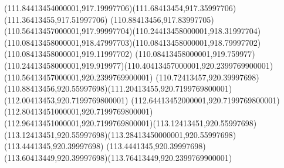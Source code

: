 {{	\curveto(111.84413454000001,917.19997706)(111.68413454,917.35997706)(111.36413455,917.51997706)
	\curveto(110.88413456,917.83997705)(110.56413457000001,917.99997704)(110.24413458000001,918.31997704)
	\curveto(110.08413458000001,918.47997703)(110.08413458000001,918.79997702)(110.08413458000001,919.11997702)
	\lineto(110.08413458000001,919.759977)
	\curveto(110.24413458000001,919.919977)(110.40413457000001,920.2399769900001)(110.56413457000001,920.2399769900001)
	\curveto(110.72413457,920.39997698)(110.88413456,920.55997698)(111.20413455,920.7199769800001)
	\lineto(112.00413453,920.7199769800001)
	\lineto(112.64413452000001,920.7199769800001)
	\curveto(112.80413451000001,920.7199769800001)(112.96413451000001,920.7199769800001)(113.12413451,920.55997698)
	\curveto(113.12413451,920.55997698)(113.28413450000001,920.55997698)(113.4441345,920.39997698)
	\curveto(113.4441345,920.39997698)(113.60413449,920.39997698)(113.76413449,920.2399769900001)
	\closepath
}
}
